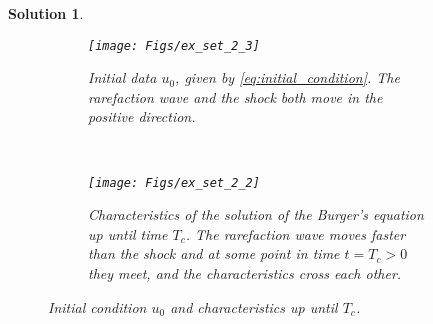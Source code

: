 \documentclass[10pt,letterpaper]{article}
\theoremstyle{break}
\newtheorem{solution}{Solution}
\begin{document}
\begin{solution}
    \begin{figure}
        \centering
        \begin{subfigure}[b]{0.5\textwidth}
            \texttt{[image: Figs/ex\_set\_2\_3]}
            \caption{Initial data $u_0$, given by \eqref{eq:initial_condition}.
            The rarefaction wave and the shock both move in the positive direction.}
            \label{fig:u_0}
        \end{subfigure}
        ~
        \begin{subfigure}[b]{0.5\textwidth}
            \texttt{[image: Figs/ex\_set\_2\_2]}
            \caption{Characteristics of the solution of the Burger's equation
            up until time $T_c$. The rarefaction wave moves faster than
            the shock and at some point in time $t = T_c > 0$ they meet,
            and the characteristics cross each other.}
            \label{fig:characteritics}
        \end{subfigure}
        \caption{Initial condition $u_0$ and characteristics up until $T_c$.}
        \label{problem3_part1}
    \end{figure}
    

\end{solution}
\end{document}
